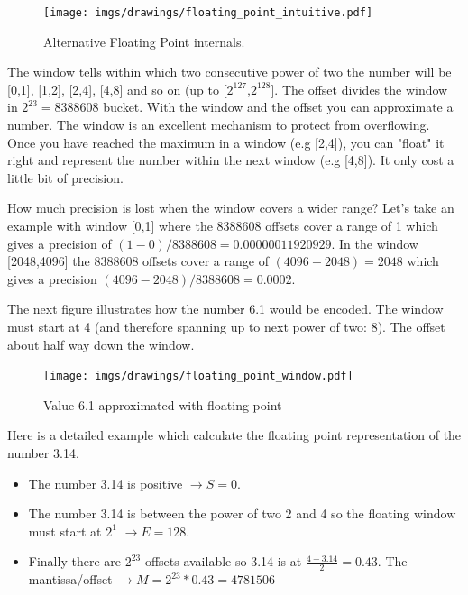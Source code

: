 \documentclass[book.tex]{subfiles}
\begin{document}
\begin{figure}[H]
\centering
\texttt{[image: imgs/drawings/floating\_point\_intuitive.pdf]}
\caption{Alternative Floating Point internals.}
\end{figure}
  \bigskip  
The window tells within which two consecutive power of two the number will be [0,1], [1,2], [2,4], [4,8] and so on (up to [$2^{127}$,$2^{128}$]. The offset divides the window in $ 2^{23} = 8388608 $  bucket. With the window and the offset you can approximate a number. The window is an excellent mechanism to protect from overflowing. Once you have reached the maximum in a window (e.g [2,4]), you can "float" it right and represent the number within the next window (e.g [4,8]). It only cost a little bit of precision.\\


\par {} How much precision is lost when the window covers a wider range? Let's take an example with window [0,1] where the 8388608 offsets cover a range of 1 which gives a precision of $(1-0)/8388608=0.00000011920929$. In the window [2048,4096] the 8388608 offsets cover a range of $(4096-2048) = 2048$ which gives a precision $ (4096-2048)/8388608=0.0002$.\\
\par

The next figure illustrates how the number 6.1 would be encoded. The window must start at 4 (and therefore spanning up to next power of two: 8). The offset about half way down the window.

\begin{figure}[H]
\centering
\texttt{[image: imgs/drawings/floating\_point\_window.pdf]}

\caption{Value 6.1 approximated with floating point}
\label{fig:fp_internals_window6_1}
\end{figure}
  \bigskip
  
Here is a detailed example which calculate the floating point representation of the number 3.14.
\begin{itemize}
 \item The number 3.14 is positive  $\rightarrow S=0$.
 \item The number 3.14 is between the power of two 2 and 4 so the floating window must start at $2^1$  $\rightarrow E=128$.
 \item Finally there are $2^{23}$ offsets available so 3.14 is at $\frac{4-3.14}{2} = 0.43 $. The mantissa/offset $\rightarrow M = 2^{23}*0.43 = 4781506$
\end{itemize}
\end{document}
